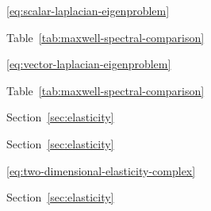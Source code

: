 \par\noindent\hspace*{1em}\label{index:eigenvalue-problem-laplace}\quad \eqref{eq:scalar-laplacian-eigenproblem}

\par\noindent\hspace*{1em}\label{index:eigenvalue-problem-maxwell}\quad Table~\ref{tab:maxwell-spectral-comparison}

\par\noindent\hspace*{1em}\label{index:eigenvalue-problem-vector-laplace}\quad \eqref{eq:vector-laplacian-eigenproblem}

\par\noindent\hspace*{0em}\label{index:eigenvalue-spurious}\quad Table~\ref{tab:maxwell-spectral-comparison}

\par\noindent\hspace*{0em}\label{index:elasticity}\quad Section~\ref{sec:elasticity}

\par\noindent\hspace*{1em}\label{index:elasticity-compliance-tensor}\quad Section~\ref{sec:elasticity}

\par\noindent\hspace*{1em}\label{index:elasticity-discretization}\quad \eqref{eq:two-dimensional-elasticity-complex}

\par\noindent\hspace*{1em}\label{index:elasticity-displacement}\quad Section~\ref{sec:elasticity}

